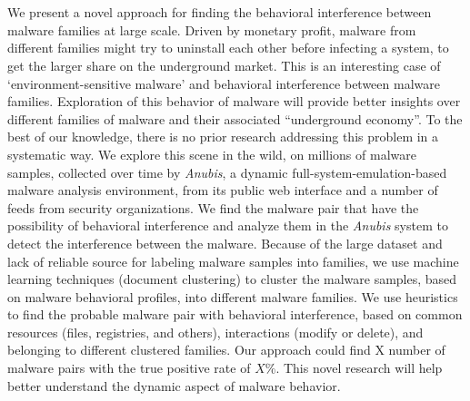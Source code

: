 \chapter{\abstractname}
We present a novel approach for finding the behavioral interference between malware families at large scale.
Driven by monetary profit, malware from different families might try to uninstall each other before infecting a system, to get the larger share on the underground market.
This is an interesting case of `environment-sensitive malware' and behavioral interference between malware families.
Exploration of this behavior of malware will provide better insights over different families of malware and their associated ``underground economy''.
To the best of our knowledge, there is no prior research addressing this problem in a systematic way.
We explore this scene in the wild, on millions of malware samples, collected over time by \emph{Anubis}, a dynamic full-system-emulation-based malware analysis environment, from its public web interface and a number of feeds from security organizations.
We find the malware pair that have the possibility of behavioral interference and analyze them in the \emph{Anubis} system to detect the interference between the malware.
Because of the large dataset and lack of reliable source for labeling malware samples into families, we use machine learning techniques (document clustering) to cluster the malware samples, based on malware behavioral profiles, into different malware families.
We use heuristics to find the probable malware pair with behavioral interference, based on common resources (files, registries, and others), interactions (modify or delete), and belonging to different clustered families.
Our approach could find X number of malware pairs with the true positive rate of $X\%$.
This novel research will help better understand the dynamic aspect of malware behavior.
